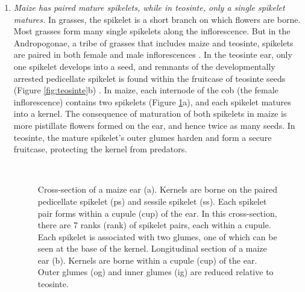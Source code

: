 \documentclass[9pt,twocolumn,twoside]{rilabRxiv}
\begin{document}
\begin{enumerate}

﻿ \item \textit{Maize has paired mature spikelets, while in teosinte, only a single spikelet matures.}
 In grasses, the spikelet is a short branch on which flowers are borne.
 Most grasses form many single spikelets along the inflorescence.
 But in the Andropogonae, a tribe of grasses that includes maize and teosinte, spikelets are paired in both female and male inflorescences \citep{kellogg2000, wu2009}.
﻿In the teosinte ear, only one spikelet develops into a seed, and remnants of the developmentally arrested pedicellate spikelet is found within the fruitcase of teosinte seeds (Figure \ref{fig:teosinte}b) \citep{weatherwax1935, sundberg1990, doebley1995sos1}.
 In maize, each internode of the cob (the female inflorescence) contains two spikelets (Figure \ref{fig:maize}a), and each spikelet matures into a kernel.
 The consequence of maturation of both spikelets in maize is more pistillate flowers formed on the ear, and hence twice as many seeds.
 In teosinte, the mature spikelet's outer glumes harden and form a secure fruitcase, protecting the  kernel from predators.

﻿   \begin{figure}
        \caption{\label{fig:maize} Cross-section of a maize ear (a). Kernels are borne on the paired pedicellate spikelet (ps) and sessile spikelet (ss). Each spikelet pair forms within a cupule (cup) of the ear. In this cross-section, there are 7 ranks (rank) of spikelet pairs, each within a cupule. Each spikelet is associated with two glumes, one of which can be seen at the base of the kernel.
        ﻿Longitudinal section of a maize ear (b). Kernels are borne within a cupule (cup) of the ear. Outer glumes (og) and inner glumes (ig) are reduced relative to teosinte.}
\end{figure}



\end{enumerate}
\end{document}

